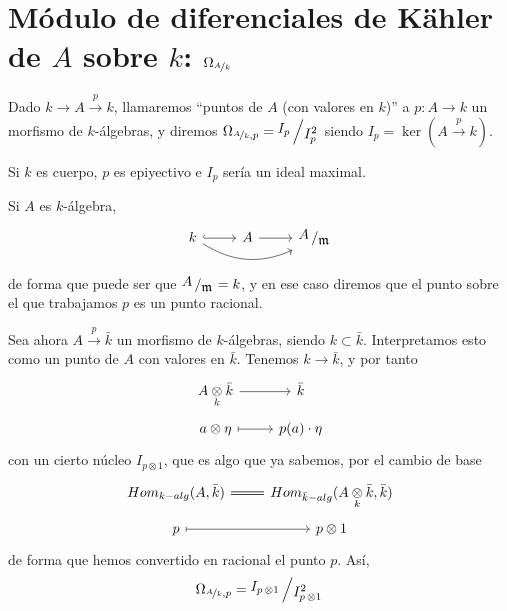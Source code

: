 \section{M\'odulo de diferenciales de Kähler de $A$ sobre $k$: $\Omega_{\nicefrac{A}{k}}$}
Dado $k \longrightarrow A \overset{p}{\longrightarrow} k$, llamaremos ``puntos de $A$ (con valores en $k$)'' a $p: A \longrightarrow k$ un morfismo de $k$-\'algebras, y diremos $\Omega_{\nicefrac{A}{k},p} = \modulo{I_p}{I_p^2}$ siendo $I_p = \ker(A \overset{p}{\longrightarrow} k)$. 

Si $k$ es cuerpo, $p$ es epiyectivo e $I_p$ ser\'ia un ideal maximal. 

Si $A$ es $k$-\'algebra, $$ \bt k\arrow[bend right=10mm]{rr} \rar[hook] &  A \rar & \modulo{A}{\m} \et$$
de forma que puede ser que $\modulo{A}{\m} = k$, y en ese caso diremos que el punto sobre el que trabajamos $p$ es un punto racional.

Sea ahora $A \overset{p}{\longrightarrow} \bar k$ un morfismo de $k$-\'algebras, siendo $k \subset \bar k$. Interpretamos esto como un punto de $A$ con valores en $\bar k$. Tenemos $k \longrightarrow \bar k$, y por tanto
$$\bt A  \underset{k}{\otimes} \bar k \rar & \bar k \\[-5mm] a\otimes \eta \rarmaps & p(a) \cdot \eta \et$$
con un cierto n\'ucleo $I_{p\otimes 1}$, que es algo que ya sabemos, por el cambio de base
$$\bt Hom_{k-alg}(A, \bar k) \rar[equal] & Hom_{\bar k-alg}(A \underset{k}{\otimes} \bar k, \bar k) \\[-5mm] p \rarmaps & p\otimes 1 \et$$
de forma que hemos convertido en racional el punto $p$. As\'i, 
$$\Omega_{\nicefrac{A}{k}, p} = \modulo{I_{p\,\otimes 1}}{I^2_{p\, \otimes 1}}$$
 

\justifying
